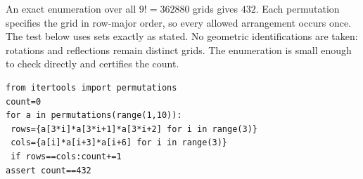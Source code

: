 An exact enumeration over all $9!=362880$ grids gives $\boxed{432}$. Each permutation specifies the grid in row-major order, so every allowed arrangement occurs once. The test below uses sets exactly as stated. No geometric identifications are taken: rotations and reflections remain distinct grids. The enumeration is small enough to check directly and certifies the count.
\begin{verbatim}
from itertools import permutations
count=0
for a in permutations(range(1,10)):
 rows={a[3*i]*a[3*i+1]*a[3*i+2] for i in range(3)}
 cols={a[i]*a[i+3]*a[i+6] for i in range(3)}
 if rows==cols:count+=1
assert count==432
\end{verbatim}
